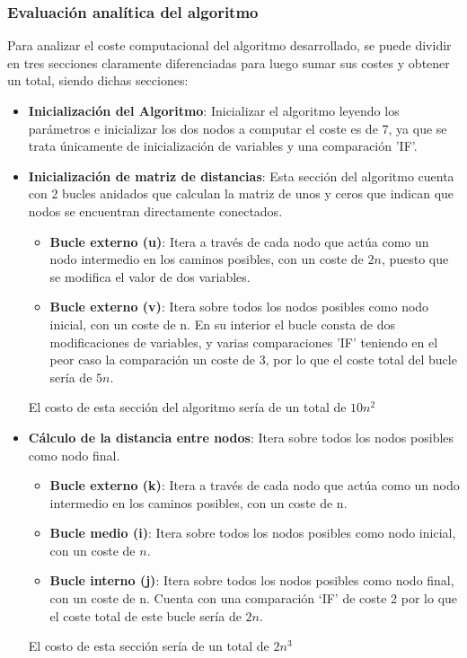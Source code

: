 \subsubsection*{Evaluación analítica del algoritmo}

Para analizar el coste computacional del algoritmo desarrollado, se puede dividir en tres secciones claramente diferenciadas para luego sumar sus costes y obtener un total, siendo dichas secciones: 
\begin{itemize}
    \item \textbf{Inicialización del Algoritmo}: Inicializar el algoritmo leyendo los parámetros e inicializar los dos nodos a computar el coste es de 7, ya que se trata únicamente de inicialización de variables y una comparación 'IF'.
    
    \item \textbf{Inicialización de matriz de distancias}: Esta sección del algoritmo cuenta con 2 bucles anidados que calculan la matriz de unos y ceros que indican que nodos se encuentran directamente conectados.
    \begin{itemize}
        \item \textbf{Bucle externo (u)}: Itera a través de cada nodo que actúa como un nodo intermedio en los caminos posibles, con un coste de $2n$, puesto que se modifica el valor de dos variables.
        \item \textbf{Bucle externo (v)}: Itera sobre todos los nodos posibles como nodo inicial, con un coste de n. En su interior el bucle consta de dos modificaciones de variables, y varias comparaciones 'IF' teniendo en el peor caso la comparación un coste de 3, por lo que el coste total del bucle sería de $5n$.
    \end{itemize}
    El costo de esta sección del algoritmo sería de un total de $10n^2$

    \item \textbf{Cálculo de la distancia entre nodos}: Itera sobre todos los nodos posibles como nodo final.
    \begin{itemize}
        \item \textbf{Bucle externo (k)}: Itera a través de cada nodo que actúa como un nodo intermedio en los caminos posibles, con un coste de n.
        \item \textbf{Bucle medio (i)}: Itera sobre todos los nodos posibles como nodo inicial, con un coste de $n$.
        \item \textbf{Bucle interno (j)}: Itera sobre todos los nodos posibles como nodo final, con un coste de n. Cuenta con una comparación `IF' de coste 2 por lo que el coste total de este bucle sería de $2n$.
    \end{itemize}
    El costo de esta sección sería de un total de $2n^3$
    
\end{itemize}

